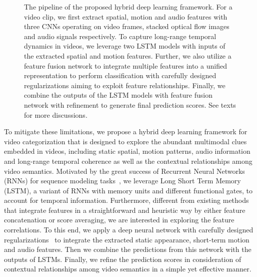 \documentclass[journal]{IEEEtran}
\begin{document}


\begin{figure*}
\centering
{}
\caption{\label{fig:framework} The pipeline of the proposed hybrid deep learning framework. For a video clip, we first extract spatial, motion and audio features with three CNNs operating on video frames, stacked optical flow images and audio signals respectively. To capture long-range temporal dynamics in videos, we leverage two LSTM models with inputs of the extracted spatial and motion features. Further, we also utilize a feature fusion network to integrate multiple features into a unified representation to perform classification with carefully designed regularizations aiming to exploit feature relationships. Finally, we combine the outputs of the LSTM models with feature fusion network with refinement to generate final prediction scores. See texts for more discussions.}
\end{figure*}

To mitigate these limitations, we propose a hybrid deep learning framework for video categorization that is designed to explore the abundant multimodal clues embedded in videos, including static spatial, motion patterns, audio information and long-range temporal coherence as well as the contextual relationships among video semantics. Motivated by the great success of Recurrent Neural Networks (RNNs) for sequence modeling tasks~\cite{DBLP:conf/icassp/GravesMH13,graves2005framewise}, we leverage Long Short Term Memory (LSTM), a variant of RNNs with memory units and different functional gates, to account for temporal information. Furthermore, different from existing methods that integrate features in a straightforward and heuristic way by either feature concatenation or score averaging, we are interested in exploring the feature correlations. To this end, we apply a deep neural network with carefully designed regularizations~\cite{TPAMI-fcvid} to integrate the extracted static appearance, short-term motion and audio features. Then we combine the predictions from this network with the outputs of LSTMs. Finally, we refine the prediction scores in consideration of contextual relationships among video semantics in a simple yet effective manner.
\end{document}
